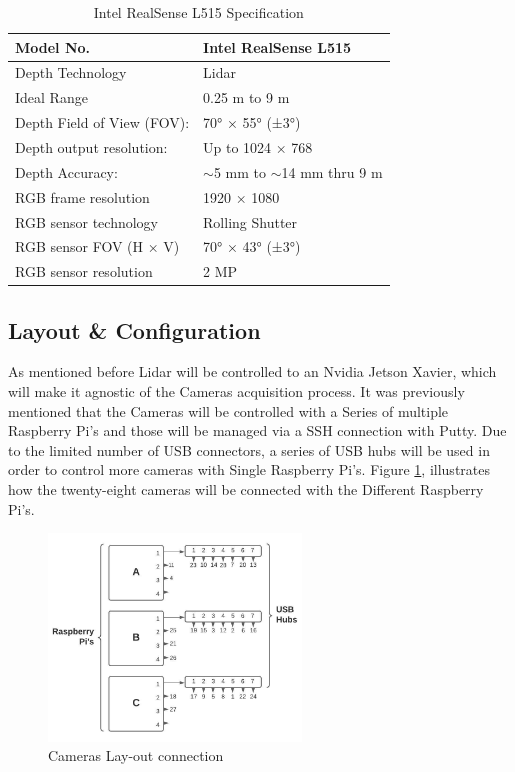 \documentclass[12pt]{report}
\begin{document}
\begin{table}[H]
    \centering
    \begin{tabular}{|l|l|}
    \hline
    Model No.                  & Intel RealSense L515               \\ \hline
    Depth Technology           & Lidar                              \\ \hline
    Ideal Range                & 0.25 m to 9 m                      \\ \hline
    Depth Field of View (FOV): & 70° × 55° (±3°)                    \\ \hline
    Depth output resolution:   & Up to 1024 × 768                   \\ \hline
    Depth Accuracy:            & $\sim$5 mm to $\sim$14 mm thru 9 m \\ \hline
    RGB frame resolution       & 1920 × 1080                        \\ \hline
    RGB sensor technology      & Rolling Shutter                    \\ \hline
    RGB sensor FOV (H × V)     & 70° × 43° (±3°)                    \\ \hline
    RGB sensor resolution      & 2 MP                               \\ \hline
    \end{tabular}
    \caption{Intel RealSense L515 Specification}
    \label{tab:lidar_specs}
\end{table}

\subsection{Layout \& Configuration}
As mentioned before Lidar will be controlled to an Nvidia Jetson Xavier, which will make it agnostic of the Cameras acquisition process. 
It was previously mentioned that the Cameras will be controlled with a Series of multiple Raspberry Pi's and those will be managed via a SSH connection with Putty. 
Due to the limited number of USB connectors, a series of USB hubs will be used in order to control more cameras with Single Raspberry Pi's.
Figure \ref{fig:cameras_layout}, illustrates how the twenty-eight cameras will be connected with the Different Raspberry Pi's.

\begin{figure}[H]%
   \centering
  \includegraphics[width=0.6\textwidth]{cameras_layout.png}
 \caption{Cameras Lay-out connection}
 \label{fig:cameras_layout} 
\end{figure}
\end{document}
